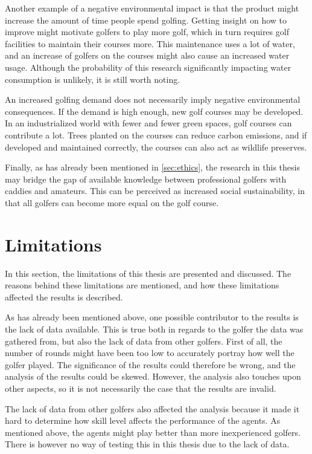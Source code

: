 \documentclass{kththesis}
\begin{document}
Another example of a negative environmental impact is that the product might increase the amount of time people spend golfing. Getting insight on how to improve might motivate golfers to play more golf, which in turn requires golf facilities to maintain their courses more. This maintenance uses a lot of water, and an increase of golfers on the courses might also cause an increased water usage. Although the probability of this research significantly impacting water consumption is unlikely, it is still worth noting. 

An increased golfing demand does not necessarily imply negative environmental consequences. If the demand is high enough, new golf courses may be developed. In an industrialized world with fewer and fewer green spaces, golf courses can contribute a lot. Trees planted on the courses can reduce carbon emissions, and if developed and maintained correctly, the courses can also act as wildlife preserves. 

Finally, as has already been mentioned in \autoref{sec:ethics}, the research in this thesis may bridge the gap of available knowledge between professional golfers with caddies and amateurs. This can be perceived as increased social sustainability, in that all golfers can become more equal on the golf course. 

\section{Limitations}
In this section, the limitations of this thesis are presented and discussed. The reasons behind these limitations are mentioned, and how these limitations affected the results is described.

As has already been mentioned above, one possible contributor to the results is the lack of data available. This is true both in regards to the golfer the data was gathered from, but also the lack of data from other golfers. First of all, the number of rounds might have been too low to accurately portray how well the golfer played. The significance of the results could therefore be wrong, and the analysis of the results could be skewed. However, the analysis also touches upon other aspects, so it is not necessarily the case that the results are invalid.

The lack of data from other golfers also affected the analysis because it made it hard to determine how skill level affects the performance of the agents. As mentioned above, the agents might play better than more inexperienced golfers. There is however no way of testing this in this thesis due to the lack of data. 
\end{document}
